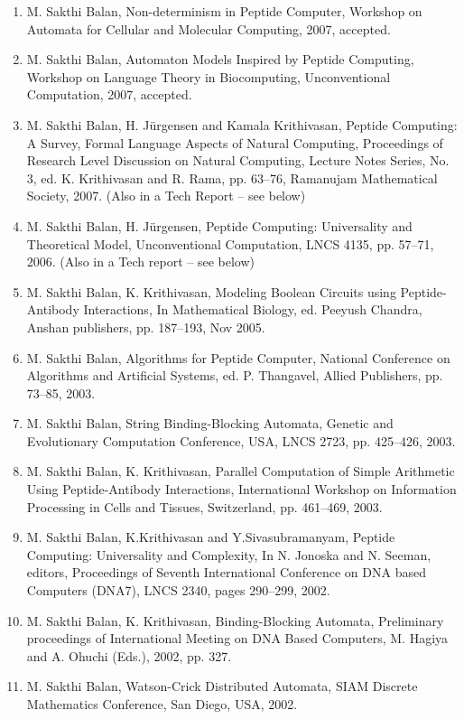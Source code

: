 \documentclass[11pt]{article}
\begin{document}
\begin{enumerate}
\item M. Sakthi Balan, Non-determinism in Peptide Computer, Workshop
  on Automata for Cellular and Molecular Computing, 2007, accepted.
\item M. Sakthi Balan, Automaton Models Inspired by Peptide Computing,
  Workshop on Language Theory in Biocomputing, Unconventional Computation, 2007, accepted.
\item M. Sakthi Balan, H. J\"{u}rgensen and Kamala Krithivasan,
  Peptide Computing: A Survey, Formal Language Aspects of Natural
  Computing, Proceedings of Research Level Discussion on Natural
  Computing, Lecture Notes Series, No.  3, ed. K. Krithivasan and R.
  Rama, pp. 63--76, Ramanujam Mathematical Society, 2007. (Also in a
  Tech Report -- see below)
\item M. Sakthi Balan, H. J\"{u}rgensen, Peptide Computing:
  Universality and Theoretical Model, Unconventional Computation, LNCS
  4135, pp. 57--71, 2006. (Also in a Tech report -- see below)
\item M. Sakthi Balan, K. Krithivasan, Modeling Boolean Circuits using
Peptide-Antibody Interactions, In Mathematical Biology, ed.  Peeyush
Chandra, Anshan publishers, pp. 187--193, Nov 2005.
\item M. Sakthi Balan, Algorithms for Peptide Computer, National
Conference on Algorithms and Artificial Systems, ed. P. Thangavel,
Allied Publishers, pp. 73--85, 2003.
\item M. Sakthi Balan, String Binding-Blocking Automata, Genetic and
Evolutionary Computation Conference, USA, LNCS 2723, pp. 425--426,
2003. 
\item M. Sakthi Balan, K. Krithivasan, Parallel Computation of Simple
Arithmetic Using Peptide-Antibody Interactions, International Workshop
on Information Processing in Cells and Tissues, Switzerland,
pp. 461--469, 2003.
\item M. Sakthi Balan, K.Krithivasan and Y.Sivasubramanyam, Peptide
Computing: Universality and Complexity, In N. Jonoska and N. Seeman,
editors, Proceedings of Seventh International Conference on DNA based
Computers (DNA7), LNCS 2340, pages 290--299, 2002.
\item M. Sakthi Balan, K. Krithivasan, Binding-Blocking Automata,
Preliminary proceedings of International Meeting on DNA Based
Computers, M. Hagiya and A. Ohuchi (Eds.), 2002, pp. 327.
\item M. Sakthi Balan, Watson-Crick Distributed Automata, SIAM
Discrete Mathematics Conference, San Diego, USA, 2002.

\end{enumerate}
\end{document}
